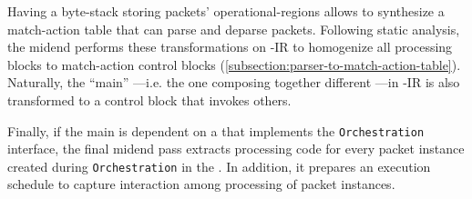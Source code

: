 \documentclass[letterpaper,twocolumn,10pt]{article}
\begin{document}
Having a byte-stack storing packets' operational-regions allows to
synthesize a match-action table that can parse and deparse packets.
Following static analysis, the midend performs these transformations
on \ucomp-IR to homogenize all processing blocks to match-action
control blocks (\cref{subsection:parser-to-match-action-table}).
Naturally, the ``main'' \uprogram---i.e. the one composing together
different \uprograms---in \ucomp-IR is also transformed to a control
block that invokes others.

Finally, if the main \uprogram is dependent on a \uprogram that
implements the \texttt{Orchestration} interface, the final midend pass
extracts processing code for every packet instance created during
\texttt{Orchestration} in the \uprogram. In addition, it prepares an
execution schedule to capture interaction among processing of packet
instances.




\end{document}
